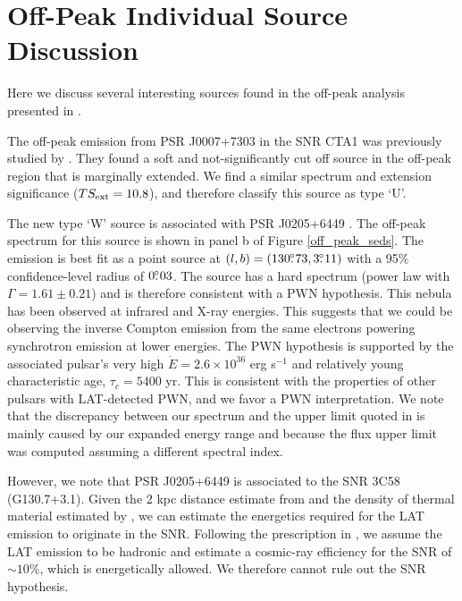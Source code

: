 \section{Off-Peak Individual Source Discussion}

Here we discuss several interesting sources found in the off-peak analysis
presented in .

The off-peak emission from PSR J0007+7303 in the SNR CTA1 was previously
studied by \cite{abdo_2012a_j00077303-supernova}.  They found a soft and
not-significantly cut off source in the off-peak region that is marginally
extended.  We find a similar spectrum and extension significance ($TS_{\rm
ext}=10.8$), and therefore classify this source as type `U'.

The new type `W' source is associated with PSR J0205+6449
\citep{abdo_2009a_discovery-pulsations}.  The off-peak spectrum for this
source is shown in panel b of Figure \ref{off_peak_seds}.  The emission
is best fit as a point source at $(l,b)=(130\mbox{$.\!\!^\circ$}73,3\mbox{$.\!\!^\circ$}11)$ with a
95\% confidence-level radius of $0\mbox{$.\!\!^\circ$}03$.  The source has a hard
spectrum (power law with $\Gamma=1.61\pm0.21$) and is therefore
consistent with a PWN hypothesis.  This nebula has been observed
at infrared \citep{slane_2008a_infrared-detection} and X-ray
\citep{slane_2004a_constraints-structure} energies. This suggests
that we could be observing the inverse Compton emission from the same
electrons powering synchrotron emission at lower energies.  The PWN
hypothesis is supported by the associated pulsar's very high $\dot
E=2.6\times10^{36}$ erg s$^{-1}$ and relatively young characteristic
age, $\tau_c = 5400$ yr. This is consistent with the properties of
other pulsars with LAT-detected PWN, and we favor a PWN interpretation.
We note that the discrepancy between our spectrum and the upper limit
quoted in \citet{ackermann_2011a_fermi-lat-search} is mainly caused by
our expanded energy range and because the flux upper limit was computed
assuming a different spectral index.

However, we note that PSR J0205+6449 is associated to the
SNR 3C58 (G130.7+3.1).  Given the 2 kpc distance estimate from
 and the density of thermal material estimated by
\cite{slane_2004a_constraints-structure}, we can estimate the energetics
required for the LAT emission to originate in the SNR.  Following the
prescription in \cite{drury_1994a_gamma-ray-visibility}, we assume the
LAT emission to be hadronic and estimate a cosmic-ray efficiency for the
SNR of $\sim10$\%, which is energetically allowed.  We therefore cannot
rule out the SNR hypothesis.

